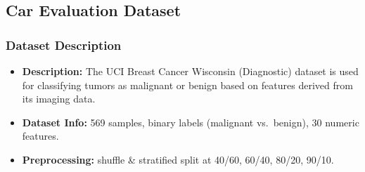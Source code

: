 \clearpage
\subsection{Car Evaluation Dataset}
\subsubsection*{Dataset Description}
\begin{itemize}
	\item \textbf{Description:} The UCI Breast Cancer Wisconsin (Diagnostic) dataset is used for classifying tumors as malignant or benign based on features derived from its imaging data.
	\item \textbf{Dataset Info:} 569 samples, binary labels (malignant vs.\ benign), 30 numeric features.
	\item \textbf{Preprocessing:} shuffle \& stratified split at 40/60, 60/40, 80/20, 90/10.
\end{itemize}

